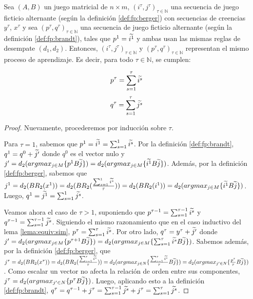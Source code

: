 \begin{lemma}
    Sea $(A, B)$ un juego matricial de $n \times m$, $(i^\tau, j^\tau)_{\tau \in \mathbb{N}}$ una secuencia de juego ficticio alternante (según la definición \ref{def:fp:berger}) con secuencias de creencias $y^\tau$, $x^\tau$ y sea $(p^\tau, q^\tau)_{\tau \in \mathbb{N}}$ una secuencia de juego ficticio alternante (según la definición \ref{def:fp:brandt}), tales que $p^1 = \widetilde{i^1}$ y ambas usan las mismas reglas de desempate $(d_1, d_2)$. Entonces, $(i^\tau, j^\tau)_{\tau \in \mathbb{N}}$ y $(p^\tau, q^\tau)_{\tau \in \mathbb{N}}$ representan el mismo proceso de aprendizaje. Es decir, para todo $\tau \in \mathbb{N}$, se cumplen:

    \[ p^{\tau} = \sum_{s=1}^\tau{\widetilde{i^s}} \]
    \[ q^{\tau} = \sum_{s=1}^\tau{\widetilde{j^s}} \]

\end{lemma}
\begin{proof}
    Nuevamente, procederemos por inducción sobre $\tau$.

    Para $\tau = 1$, sabemos que $p^1 = \widetilde{i^1} = \sum_{s=1}^1{\widetilde{i^s}}$.
    Por la definición \ref{def:fp:brandt}, $q^1 = q^0 + \widetilde{j'}$ donde $q^0$ es el vector nulo y
    $j' = d_2(argmax_{j \in M}\{p^{1}B\widetilde{j}\}) = d_2(argmax_{j \in M}\{\widetilde{i^{1}}B\widetilde{j}\})$.
    Además, por la definición \ref{def:fp:berger}, sabemos que
    $j^1 = d_2(BR_2(x^1)) = d_2(BR_2(\frac{\sum^1_{s=1} \widetilde{i^s}}{\tau})) = d_2(BR_2(i^1)) = d_2(argmax_{j \in M}\{\widetilde{i^{1}}B\widetilde{j}\})$.
    Luego, $q^1 = \widetilde{j^1} = \sum_{s=1}^1{\widetilde{j^s}}$.

    Veamos ahora el caso de $\tau > 1$, suponiendo que
    $p^{\tau-1} = \sum_{s=1}^{\tau-1}{\widetilde{i^s}}$ y $q^{\tau-1} = \sum_{s=1}^{\tau-1}{\widetilde{j^s}}$.
    Siguiendo el mismo razonamiento que en el caso inductivo del lema \ref{lema:equiv:sim},
    $p^{\tau} = \sum_{s=1}^\tau{\widetilde{i^s}}$.
    Por otro lado, $q^{\tau} = y^{\tau} + \widetilde{j'}$ donde
    $j' = d_2(argmax_{j \in M}\{p^{\tau+1}B\widetilde{j}\}) = d_2(argmax_{j \in M}\{\sum_{s=1}^\tau{\widetilde{i^s}}B\widetilde{j}\})$.
    Sabemos además, por la definición \ref{def:fp:berger}, que
    $j^\tau = d_2(BR_2(x^{\tau})) = d_2(BR_2(\frac{\sum_{s=1}^{\tau}{\widetilde{i^s}}}{\tau})) = d_2(argmax_{j \in N}\{\frac{\sum_{s=1}^{\tau}{\widetilde{i^s}}}{\tau}B\widetilde{j}\})  = d_2(argmax_{j' \in N}\{\frac{p^{\tau}}{\tau}B\widetilde{j}\})$.
    Como escalar un vector no afecta la relación de orden entre sus componentes,
    $j^\tau = d_2(argmax_{j' \in N}\{p^{\tau}B\widetilde{j}\})$.
    Luego, aplicando esto a la definición \ref{def:fp:brandt},
    $q^\tau = q^{\tau-1} + j^\tau = \sum_{s=1}^{\tau-1}{\widetilde{j^s}} + j^\tau = \sum_{s=1}^{\tau}{\widetilde{j^s}}$.
\end{proof}


